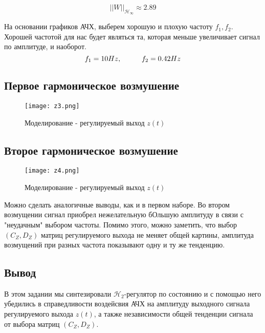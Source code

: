$$
    ||W||_{\mathcal{H}_\infty}  \approx 2.89
$$

На основании графиков АЧХ, выберем хорошую и плохую частоту $f_1, f_2$. 
Хорошей частотой для нас будет являться та, которая меньше увеличивает сигнал по амплитуде, и наоборот.
$$
    f_1 = 10 Hz, \hspace*{1cm} f_2 = 0.42 Hz
$$

\newpage
\subsection{Первое гармоническое возмушение}
\begin{figure}[ht]
    \centering
    \texttt{[image: z3.png]}
    \caption{Моделирование -  регулируемый выход $z(t)$}
  \end{figure}
\newpage
\subsection{Второе гармоническое возмушение}
\begin{figure}[ht]
    \centering
    \texttt{[image: z4.png]}
    \caption{Моделирование -  регулируемый выход $z(t)$}
\end{figure}

Можно сделать аналогичные выводы, как и в первом наборе. Во втором возмущении сигнал приобрел нежелательную бОльшую амплитуду в связи с "неудачным" 
выбором частоты. Помимо этого, можно заметить, что выбор $(C_Z,D_Z)$ матриц регулируемого выхода не меняет общей картины, 
амплитуда возмущений при разных частота показывают одну и ту же тенденцию.

\subsection{Вывод}
В этом задании мы синтезировали $\mathcal{H}_2$-регулятор по состоянию 
и с помощью него убедились в справедливости воздейсвия АЧХ на амплитуду выходного сигнала регулируемого выхода $z(t)$, а также
независимости общей тенденции сигнала от выбора матриц $(C_Z,D_Z)$.
\endinput 
